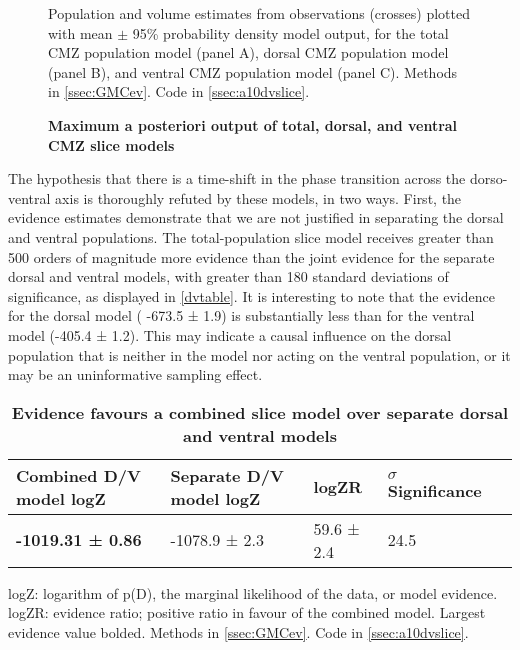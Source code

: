\begin{figure}[!h]
    \caption{{\bf Maximum a posteriori output of total, dorsal, and ventral CMZ slice models}}
    \label{dvMAPout}
    Population and volume estimates from observations (crosses) plotted with mean $\pm$ 95\% probability density model output, for the total CMZ population model (panel A), dorsal CMZ population model (panel B), and ventral CMZ population model (panel C).
    Methods in \autoref{ssec:GMCev}.
    Code in \autoref{ssec:a10dvslice}. 
\end{figure}

The hypothesis that there is a time-shift in the phase transition across the dorso-ventral axis is thoroughly refuted by these models, in two ways. First, the evidence estimates demonstrate that we are not justified in separating the dorsal and ventral populations. The total-population slice model receives greater than 500 orders of magnitude more evidence than the joint evidence for the separate dorsal and ventral models, with greater than 180 standard deviations of significance, as displayed in \autoref{dvtable}. It is interesting to note that the evidence for the dorsal model (
-673.5 ± 1.9) is substantially less than for the ventral model (-405.4 ± 1.2). This may indicate a causal influence on the dorsal population that is neither in the model nor acting on the ventral population, or it may be an uninformative sampling effect. 

\begin{table}[!ht]
    \centering
    \caption{{\bf Evidence favours a combined slice model over separate dorsal and ventral models}}
    \begin{tabular}{|l|l|l|l|l|}
        \hline
        {\bf Combined D/V model logZ} & {\bf Separate D/V model logZ} & {\bf logZR} & {\bf $\sigma$ Significance}\\ \hline
        \textbf{-1019.31 ± 0.86} & -1078.9 ± 2.3 & 59.6 ± 2.4 & 24.5\\ \hline
        \end{tabular}
    \begin{flushleft} logZ: logarithm of p(D), the marginal likelihood of the data, or model evidence. logZR: evidence ratio; positive ratio in favour of the combined model. Largest evidence value bolded.
    Methods in \autoref{ssec:GMCev}.
    Code in \autoref{ssec:a10dvslice}.     
    \end{flushleft}
    \label{dvtable}
\end{table}

